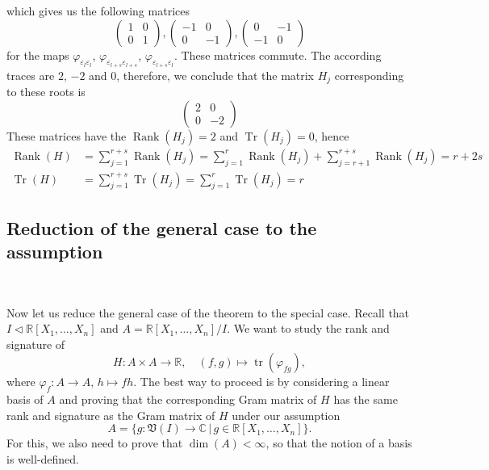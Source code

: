 \documentclass{amsart}
\begin{document}
which gives us the following matrices
\[
\begin{pmatrix}
1 & 0 \\
0 & 1
\end{pmatrix}
,
\begin{pmatrix}
-1 & 0 \\
0 & -1
\end{pmatrix}
,
\begin{pmatrix}
0 & -1 \\
-1 & 0
\end{pmatrix}
\]
for the maps $\varphi_{\varepsilon_{l} \varepsilon_{l}}$, $\varphi_{\varepsilon_{l+s} \varepsilon_{l+s}}$, $\varphi_{\varepsilon_{l+s} \varepsilon_{l}}$. These matrices commute. The according traces are $2$, $-2$ and $0$, therefore, we conclude that the matrix $H_j$ corresponding to these roots is 
\[
\begin{pmatrix}
    2 & 0 \\
    0 & -2
\end{pmatrix}
\]
These matrices have the $\operatorname{Rank}(H_j)=2$ and $\operatorname{Tr}(H_j)=0$, hence
\begin{align*}
    \operatorname{Rank}(H) &= \sum_{j=1}^{r+s} \operatorname{Rank}(H_j) = \sum_{j=1}^{r} \operatorname{Rank}(H_j) + \sum_{j=r+1}^{r+s} \operatorname{Rank}(H_j) = r+2s \\
    \operatorname{Tr}(H) &= \sum_{j=1}^{r+s} \operatorname{Tr}(H_j) = \sum_{j=1}^{r} \operatorname{Tr}(H_j) = r
\end{align*}

\vspace{1em}

\subsection{Reduction of the general case to the assumption}~

Now let us reduce the general case of the theorem to the special case. Recall that $I \triangleleft \mathbb{R}[X_1, \ldots, X_n]$ and $A = \mathbb{R}[X_1, \ldots, X_n]/I$. We want to study the rank and signature of 
\[
H : A \times A \to \mathbb{R}, \quad (f,g) \mapsto \operatorname{tr}(\varphi_{fg}),
\]
where $\varphi_f : A \to A, \, h \mapsto fh$. The best way to proceed is by considering a linear basis of $A$ and proving that the corresponding Gram matrix of $H$ has the same rank and signature as the Gram matrix of $H$ under our assumption 
\[
A = \{g : \mathfrak{V}(I) \to \mathbb{C} \, | \, g \in \mathbb{R}[X_1, \ldots, X_n]\}.
\]
For this, we also need to prove that $\dim(A) < \infty$, so that the notion of a basis is well-defined.
\end{document}
